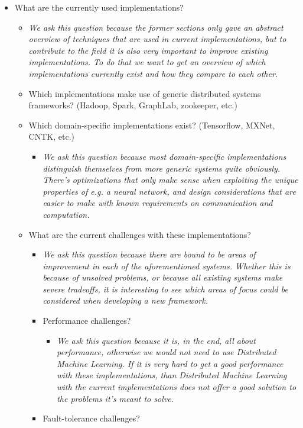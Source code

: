 \begin{itemize}
\begin{itemize}
	\end{itemize}
	\item What are the currently used implementations?
	\begin{itemize}
		\item \textit{We ask this question because the former sections only gave an abstract overview of techniques that are used in current implementations, but to contribute to the field it is also very important to improve existing implementations. To do that we want to get an overview of which implementations currently exist and how they compare to each other.}
		\item Which implementations make use of generic distributed systems frameworks? (Hadoop, Spark, GraphLab, zookeeper, etc.)
		\item Which domain-specific implementations exist? (Tensorflow, MXNet, CNTK, etc.)
		\begin{itemize}
			\item \textit{We ask this question because most domain-specific implementations distinguish themselves from more generic systems quite obviously. There’s optimizations that only make sense when exploiting the unique properties of e.g. a neural network, and design considerations that are easier to make with known requirements on communication and computation.}
		\end{itemize}
		\item What are the current challenges with these implementations?
		\begin{itemize}
			\item \textit{We ask this question because there are bound to be areas of improvement in each of the aforementioned systems. Whether this is because of unsolved problems, or because all existing systems make severe tradeoffs, it is interesting to see which areas of focus could be considered when developing a new framework.}
			\item Performance challenges?
			\begin{itemize}
				\item \textit{We ask this question because it is, in the end, all about performance, otherwise we would not need to use Distributed Machine Learning. If it is very hard to get a good performance with these implementations, than Distributed Machine Learning with the current implementations does not offer a good solution to the problems it’s meant to solve.}
			\end{itemize}
			\item Fault-tolerance challenges?

\end{itemize}
\end{itemize}
\end{itemize}
